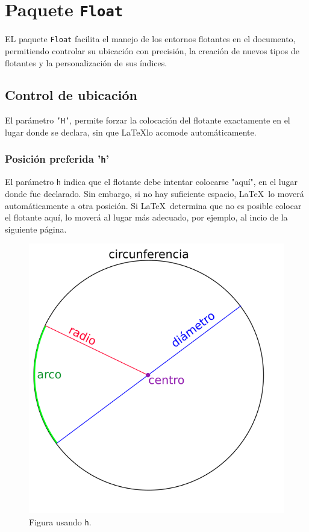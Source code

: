 \documentclass{book}
\begin{document}
\chapter*{Paquete \texttt{Float}}\label{ch:float}
EL paquete \texttt{Float} facilita el manejo de los entornos flotantes en el documento, permitiendo controlar su ubicación con precisión, la creación de nuevos tipos de flotantes y la personalización de sus índices.

\section{Control de ubicación}\label{sec:ubicacion_float}
El parámetro \texttt{'H'}, permite forzar la colocación del flotante exactamente en el lugar donde se declara, sin que \LaTeX lo acomode automáticamente.

\subsection*{Posición preferida '\texttt{h}'}
El parámetro \texttt{h} indica que el flotante debe intentar colocarse "aquí", en el lugar donde fue declarado. Sin embargo, si no hay suficiente espacio, \LaTeX\ lo moverá automáticamente a otra posición. Si \LaTeX\ determina que no es posible colocar el flotante aquí, lo moverá al lugar más adecuado, por ejemplo, al incio de la siguiente página.

\vspace{1.5cm} %

\begin{figure}[h]
    \centering
    \includegraphics[scale=.2,draft]{imagen-ejemplo.png}
    \caption{Figura usando \texttt{h}.}
    \label{fig:h}
\end{figure}
\end{document}
